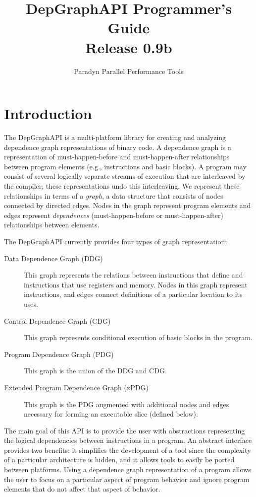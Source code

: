 \documentclass[12pt,titlepage]{article}
\begin{document}
\title{DepGraphAPI Programmer's Guide \\ Release 0.9b}
\author{Paradyn Parallel Performance Tools}
\maketitle
\tableofcontents
\section{Introduction}

The DepGraphAPI is a multi-platform library for creating and analyzing
dependence graph representations of binary code. A dependence graph is
a representation of must-happen-before and must-happen-after
relationships between program elements (e.g., instructions and basic
blocks). A program may consist of several logically separate streams
of execution that are interleaved by the compiler; these
representations undo this interleaving. We represent these
relationships in terms of a \emph{graph}, a data structure that
consists of nodes connected by directed edges. Nodes in the graph
represent program elements and edges represent \emph{dependences}
(must-happen-before or must-happen-after) relationships between
elements.

The DepGraphAPI currently provides four types of graph representation:
\begin{description}
\item[Data Dependence Graph (DDG)] This graph represents the relations
between instructions that define and instructions that use registers
and memory. Nodes in this graph represent instructions, and edges
connect definitions of a particular location to its uses.
\item[Control Dependence Graph (CDG)] This graph represents conditional execution of basic blocks in the program. 
\item[Program Dependence Graph (PDG)] This graph is the union of the DDG and CDG. 
\item[Extended Program Dependence Graph (xPDG)] This graph is the PDG
augmented with additional nodes and edges necessary for forming an
executable slice (defined below).
\end{description}

The main goal of this API is to provide the user with abstractions
representing the logical dependencies between instructions in a
program. An abstract interface provides two benefits: it simplifies
the development of a tool since the complexity of a particular
architecture is hidden, and it allows tools to easily be ported
between platforms. Using a dependence graph representation of a
program allows the user to focus on a particular aspect of program
behavior and ignore program elements that do not affect that aspect of
behavior.
\end{document}
